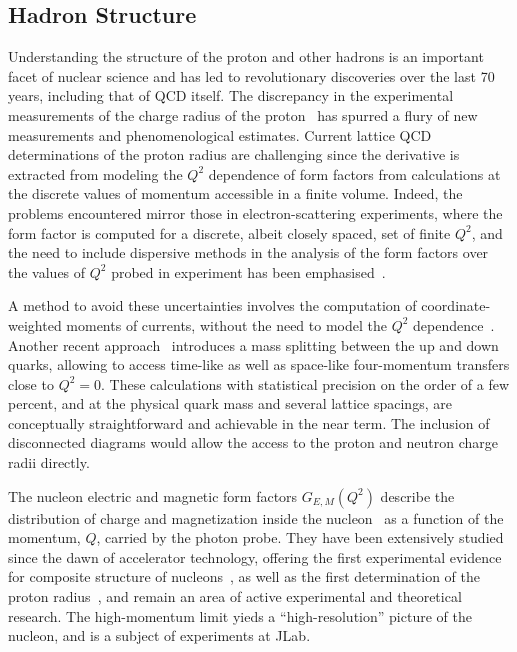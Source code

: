 
\subsection{Hadron Structure}

Understanding the structure of the proton and other hadrons is an important facet of  nuclear science and  has led to revolutionary discoveries over the last 70 years, including that of QCD itself.  
The discrepancy in the experimental measurements of the charge radius of the proton~\cite{Antognini:1900ns} has spurred a flury of new measurements and phenomenological estimates. Current lattice QCD determinations of the proton radius are challenging since the derivative is extracted from modeling the $Q^2$ dependence of form factors from calculations at the discrete values of momentum accessible in a finite volume.  Indeed, the problems encountered mirror those in electron-scattering experiments, where the form factor is computed for a discrete, albeit closely spaced, set of finite $Q^2$, and the need to include dispersive methods in the analysis of the form factors over the values of $Q^2$ probed in experiment has been emphasised~\cite{Alarcon:2018irp}.

A method to avoid these uncertainties involves the computation of coordinate-weighted moments of currents, without the need to model the $Q^2$ dependence~\cite{Bouchard:2016gmc}. Another recent approach~\cite{Detmold:2018ptb} introduces a mass splitting between the up and down quarks, allowing to access time-like as well as space-like four-momentum transfers close to $Q^2=0$. These calculations with statistical precision on the order of a few percent, and at the physical quark mass and several lattice spacings, are conceptually straightforward and achievable in the near term. The inclusion of disconnected diagrams would allow the access to the proton and neutron charge radii directly.

The nucleon electric and magnetic form factors $G_{E,M}(Q^2)$ describe the distribution of charge and
magnetization inside the
nucleon~\cite{Burkardt:2000za,Burkardt:2002hr,Miller:2007uy,Carlson:2007xd} as a function of the momentum, $Q$, carried by the photon probe.
They have been extensively studied since the dawn of
accelerator technology, offering the first experimental evidence for composite structure 
of nucleons~\cite{Hofstadter:1955ae}, as well as the first
determination of the proton radius~\cite{Chambers:1956zz},
and remain an area of active experimental and theoretical research. The high-momentum limit yieds a ``high-resolution'' picture of the nucleon, and is a subject of experiments at JLab.

